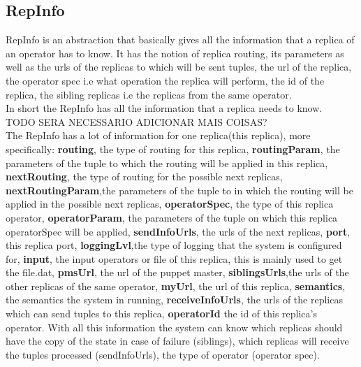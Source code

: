 \documentclass[times, 10pt, twocolumn]{article}
\begin{document}
\subsection{RepInfo}
RepInfo is an abstraction that basically gives all the information that a replica of an operator has to know. It has the notion of replica routing, its parameters as well as the urls of the replicas to which will be sent tuples, the url of the replica, the operator spec i.e what operation the replica will perform, the id of the replica, the sibling replicas i.e the replicas from the same operator. 
\\In short the RepInfo has all the information that a replica needs to know.
\\TODO SERA NECESSARIO ADICIONAR MAIS COISAS?
\\The RepInfo has a lot of information for one replica(this replica), more specifically: \textbf{routing}, the type of routing for this replica, \textbf{routingParam}, the parameters of the tuple to which the routing will be applied in this replica, \textbf{nextRouting}, the type of routing for the possible next replicas, \textbf{nextRoutingParam},the parameters of the tuple to in which the routing will be applied in the possible next replicas, \textbf{operatorSpec}, the type of this replica operator, \textbf{operatorParam}, the parameters of the tuple on which this replica operatorSpec will be applied, \textbf{sendInfoUrls}, the urls of the next replicas, \textbf{port}, this replica port, \textbf{loggingLvl},the type of logging that the system is configured for, \textbf{input}, the input operators or file of this replica, this is mainly used to get the file.dat, \textbf{pmsUrl}, the url of the puppet master, \textbf{siblingsUrls},the urls of the other replicas of the same operator,  \textbf{myUrl}, the url of this replica,   \textbf{semantics}, the semantics the system in running,  \textbf{receiveInfoUrls}, the urls of the replicas which can send tuples to this replica, \textbf{operatorId} the id of this replica's operator. With all this information the system can know which replicas should have the copy of the state in case of failure (siblings), which replicas will receive the tuples processed (sendInfoUrls), the type of operator (operator spec).


\end{document}
